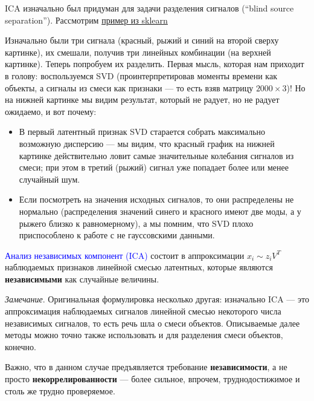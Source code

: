 \documentclass{amsart}
\theoremstyle{definition}
\theoremstyle{remark}
\numberwithin{equation}{section}
\begin{document}
ICA изначально был придуман для задачи разделения сигналов (``blind source separation''). Рассмотрим \href{https://scikit-learn.org/stable/auto_examples/decomposition/plot_ica_blind_source_separation.html#sphx-glr-auto-examples-decomposition-plot-ica-blind-source-separation-py}{пример из sklearn}
\begin{center}
\end{center}
Изначально были три сигнала (красный, рыжий и синий на второй сверху картинке), их смешали, получив три линейных комбинации (на верхней картинке). Теперь попробуем их разделить. Первая мысль, которая нам приходит в голову: воспользуемся SVD (проинтерпретировав моменты времени как объекты, а сигналы из смеси как признаки --- то есть взяв матрицу $2000\times3$)! Но на нижней картинке мы видим результат, который не радует, но не радует ожидаемо, и вот почему:
\begin{itemize}
\item В первый латентный признак SVD старается собрать максимально возможную дисперсию --- мы видим, что красный график на нижней картинке действительно ловит самые значительные колебания сигналов из смеси; при этом в третий (рыжий) сигнал уже попадает более или менее случайный шум.
\item Если посмотреть на значения исходных сигналов, то они распределены не нормально (распределения значений синего и красного имеют две моды, а у рыжего близко к равномерному), а мы помним, что SVD плохо приспособлено к работе с не гауссовскими данными.
\end{itemize}

\textcolor{blue}{Анализ независимых компонент (ICA)} состоит в аппроксимации $x_i\sim z_iV^T$ наблюдаемых признаков линейной смесью латентных, которые являются \textbf{независимыми} как случайные величины.

\medskip

\textit{Замечание}. Оригинальная формулировка несколько другая: изначально ICA --- это аппроксимация наблюдаемых сигналов линейной смесью некоторого числа независимых сигналов, то есть речь шла о смеси объектов. Описываемые далее методы можно точно также использовать и для разделения смеси объектов, конечно.

\medskip

Важно, что в данном случае предъявляется требование \textbf{независимости}, а не просто \textbf{некоррелированности} --- более сильное, впрочем, труднодостижимое и столь же трудно проверяемое.
\end{document}
